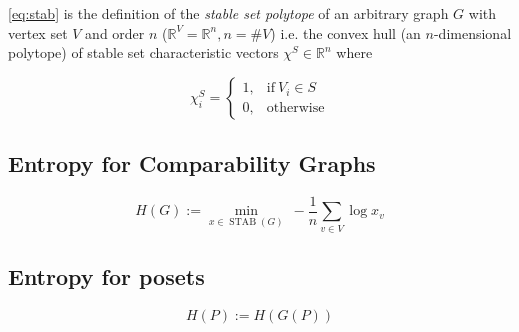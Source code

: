\ref{eq:stab} is the definition of the \emph{stable set polytope} of an arbitrary graph $G$ with vertex set $V$ and order $n$ ($\mathbb{R}^V = \mathbb{R}^n, n = \#V$) i.e. the convex hull (an $n$-dimensional polytope) of stable set characteristic vectors $\chi^S \in \mathbb{R}^n$ where

$$ \chi^S_i =\begin{cases}
      1, & \text{if}\ V_i \in S\\
      0, & \text{otherwise}
    \end{cases}$$


\subsection{Entropy for Comparability Graphs}
\begin{equation}
{H}(G) := \min_{x \in \operatorname{STAB}(G)}~ -\frac{1}{n} \sum_{v \in V} \log x_v
\label{eq:entropy:graph}
\end{equation}

\subsection{Entropy for posets}
\begin{equation}
{H}(P) := {H}({G}(P))
\label{eq:entropy:poset}
\end{equation}
